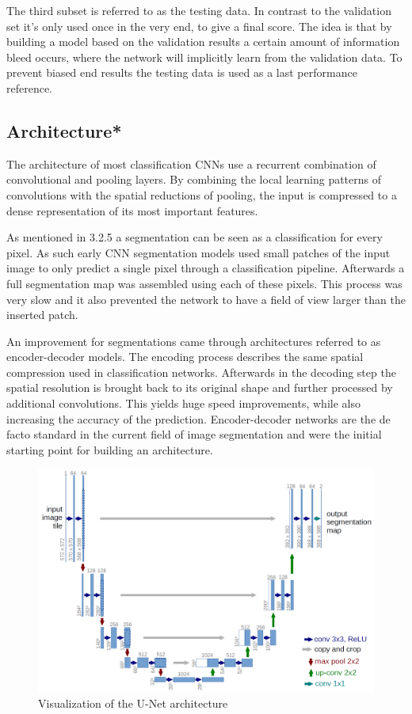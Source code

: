 The third subset is referred to as the testing data. In contrast to the validation set it's only used once in the very end, to give a final score. The idea is that by building a model based on the validation results a certain amount of information bleed occurs, where the network will implicitly learn from the validation data. To prevent biased end results the testing data is used as a last performance reference.

\subsection{Architecture*}

The architecture of most classification CNNs use a recurrent combination of convolutional and pooling layers. By combining the local learning patterns of convolutions with the spatial reductions of pooling, the input is compressed to a dense representation of its most important features.

As mentioned in 3.2.5 a segmentation can be seen as a classification for every pixel. As such early CNN segmentation models used small patches of the input image to only predict a single pixel through a classification pipeline. Afterwards a full segmentation map was assembled using each of these pixels. This process was very slow and it also prevented the network to have a field of view larger than the inserted patch.

An improvement for segmentations came through architectures referred to as encoder-decoder models. The encoding process describes the same spatial compression used in classification networks. Afterwards in the decoding step the spatial resolution is brought back to its original shape and further processed by additional convolutions. This yields huge speed improvements, while also increasing the accuracy of the prediction. Encoder-decoder networks are the de facto standard in the current field of image segmentation and were the initial starting point for building an architecture.

\begin{figure}
\centering
\par
\includegraphics[width=1.0\textwidth]{imgs/unet.png}
\caption{Visualization of the U-Net architecture}
\par
\end{figure}

